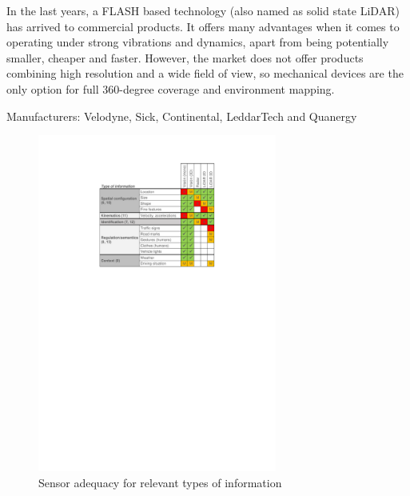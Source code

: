 In the last years, a FLASH based technology (also named as solid state LiDAR) has arrived to commercial products. It offers many advantages when it comes to operating under strong vibrations and dynamics, apart from being potentially smaller, cheaper and faster.
However, the market does not offer products combining high resolution and a wide field of view, so mechanical devices are the only option for full 360-degree coverage and environment mapping.

Manufacturers: Velodyne, Sick, Continental, LeddarTech and Quanergy


%    




\begin{figure}[h]
    \centering
    \includegraphics[width=0.7\textwidth]{"img/information_types_sensors"}
    \caption{Sensor adequacy for relevant types of information}
    \label{fig:information_vs_sensors}
\end{figure}
